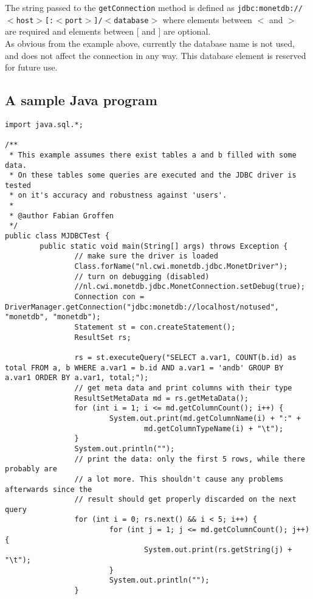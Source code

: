 \documentclass{article}
\begin{document}
The string passed to the \texttt{getConnection} method is defined as
\texttt{jdbc:monetdb://$<$host$>$[:$<$port$>$]/$<$database$>$} where elements between
$<$ and $>$ are required and elements between [ and ] are optional.\\
As obvious from the example above, currently the database name is not used, and does not affect
the connection in any way. This database element is reserved for future use.

\subsection{A sample Java program}
\begin{verbatim}
import java.sql.*;

/**
 * This example assumes there exist tables a and b filled with some data.
 * On these tables some queries are executed and the JDBC driver is tested
 * on it's accuracy and robustness against 'users'.
 *
 * @author Fabian Groffen
 */
public class MJDBCTest {
        public static void main(String[] args) throws Exception {
                // make sure the driver is loaded
                Class.forName("nl.cwi.monetdb.jdbc.MonetDriver");
                // turn on debugging (disabled)
                //nl.cwi.monetdb.jdbc.MonetConnection.setDebug(true);
                Connection con = DriverManager.getConnection("jdbc:monetdb://localhost/notused", "monetdb", "monetdb");
                Statement st = con.createStatement();
                ResultSet rs;

                rs = st.executeQuery("SELECT a.var1, COUNT(b.id) as total FROM a, b WHERE a.var1 = b.id AND a.var1 = 'andb' GROUP BY a.var1 ORDER BY a.var1, total;");
                // get meta data and print columns with their type
                ResultSetMetaData md = rs.getMetaData();
                for (int i = 1; i <= md.getColumnCount(); i++) {
                        System.out.print(md.getColumnName(i) + ":" +
                                md.getColumnTypeName(i) + "\t");
                }
                System.out.println("");
                // print the data: only the first 5 rows, while there probably are
                // a lot more. This shouldn't cause any problems afterwards since the
                // result should get properly discarded on the next query
                for (int i = 0; rs.next() && i < 5; i++) {
                        for (int j = 1; j <= md.getColumnCount(); j++) {
                                System.out.print(rs.getString(j) + "\t");
                        }
                        System.out.println("");
                }
                

\end{verbatim}
\end{document}

